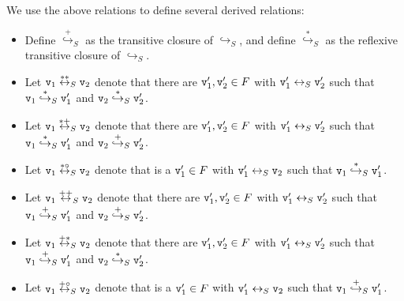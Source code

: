 We use the above relations to define several derived relations:
\begin{itemize}
\item Define $\overset{+}\hookrightarrow_S$ as the transitive closure of
  $\hookrightarrow_S$, and define
   $\overset{*}\hookrightarrow_S$ as the reflexive transitive closure of
$\hookrightarrow_S$.
\item Let $\mathtt{v}_1  \overset{**}\leftrightarrow_S  \mathtt{v}_2$ denote that there are
  $\mathtt{v}_1',\mathtt{v}_2' \in F$ with $\mathtt{v}_1' \leftrightarrow_S \mathtt{v}_2'$ such that
  $\mathtt{v}_1  \overset{*}\hookrightarrow_S \mathtt{v}_1'$ and $\mathtt{v}_2  \overset{*}\hookrightarrow_S \mathtt{v}_2'$.
\item Let $\mathtt{v}_1  \overset{*+}\leftrightarrow_S  \mathtt{v}_2$ denote that there are
  $\mathtt{v}_1', \mathtt{v}_2' \in F$ with $\mathtt{v}_1' \leftrightarrow_S \mathtt{v}_2'$ such that
  $\mathtt{v}_1  \overset{*}\hookrightarrow_S \mathtt{v}_1'$ and $\mathtt{v}_2  \overset{+}\hookrightarrow_S \mathtt{v}_2'$.
\item Let $\mathtt{v}_1  \overset{*\circ}\leftrightarrow_S  \mathtt{v}_2$ denote that is a
  $\mathtt{v}_1' \in F$ with $\mathtt{v}_1' \leftrightarrow_S \mathtt{v}_2$ such that
  $\mathtt{v}_1  \overset{*}\hookrightarrow_S \mathtt{v}_1'$.
\item Let $\mathtt{v}_1  \overset{++}\leftrightarrow_S  \mathtt{v}_2$ denote that there are
  $\mathtt{v}_1',\mathtt{v}_2' \in F$ with $\mathtt{v}_1' \leftrightarrow_S \mathtt{v}_2'$ such that
  $\mathtt{v}_1  \overset{+}\hookrightarrow_S \mathtt{v}_1'$ and $\mathtt{v}_2  \overset{+}\hookrightarrow_S \mathtt{v}_2'$.
\item Let $\mathtt{v}_1  \overset{+*}\leftrightarrow_S  \mathtt{v}_2$ denote that there are
  $\mathtt{v}_1', \mathtt{v}_2' \in F$ with $\mathtt{v}_1' \leftrightarrow_S \mathtt{v}_2'$ such that
  $\mathtt{v}_1  \overset{+}\hookrightarrow_S \mathtt{v}_1'$ and $\mathtt{v}_2  \overset{*}\hookrightarrow_S \mathtt{v}_2'$.
\item Let $\mathtt{v}_1  \overset{+\circ}\leftrightarrow_S  \mathtt{v}_2$ denote that is a
  $\mathtt{v}_1' \in F$ with $\mathtt{v}_1' \leftrightarrow_S \mathtt{v}_2$ such that
  $\mathtt{v}_1  \overset{+}\hookrightarrow_S \mathtt{v}_1'$.
\end{itemize}

